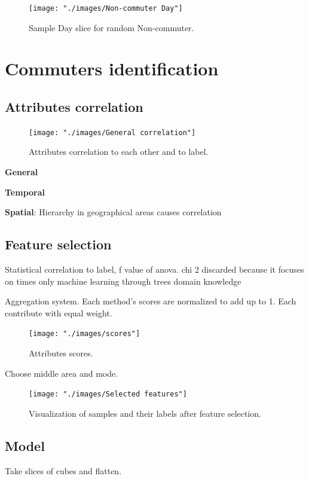 \documentclass{article}
\begin{document}
\begin{figure}[H]
  \centering
  \texttt{[image: "./images/Non-commuter Day"]}
  \caption{Sample Day slice for random Non-commuter.}
  \label{fig:preprocessing/commuter}
\end{figure}


\newpage
\section{Commuters identification}
\label{sec:partII}

\subsection{Attributes correlation}

\begin{figure}[H]
  \centering
  \texttt{[image: "./images/General correlation"]}
  \caption{Attributes correlation to each other and to label.}
  \label{fig:classification/correlation}
\end{figure}

\textbf{General}

\textbf{Temporal}

\textbf{Spatial}: Hierarchy in geographical areas causes correlation

\subsection{Feature selection}
Statistical correlation to label, f value of anova. chi 2 discarded because it focuses on times only
machine learning through trees
domain knowledge

Aggregation system. Each method's scores are normalized to add up to 1. Each contribute with equal weight. 

\begin{figure}[H]
  \centering
  \texttt{[image: "./images/scores"]}
  \caption{Attributes scores.}
  \label{fig:classification/scores}
\end{figure}

Choose middle area and mode. 

\begin{figure}[H]
  \centering
  \texttt{[image: "./images/Selected features"]}
  \caption{Visualization of samples and their labels after feature selection.}
  \label{fig:classification/tsne}
\end{figure}

\subsection{Model}
Take slices of cubes and flatten. 
\end{document}
